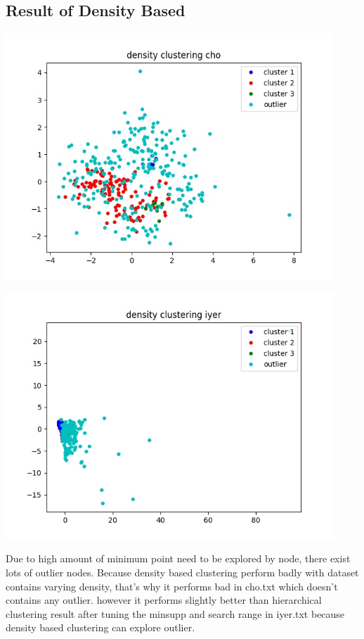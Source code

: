\documentclass[fleqn]{llncs}
\begin{document}
\subsection{Result of Density Based}

\includegraphics[width=350pt]{densitycho.jpg}

\includegraphics[width=350pt]{densityiyer.jpg}

Due to high amount of minimum point need to be explored by node, there exist lots of outlier nodes. Because density based clustering perform badly with dataset contains varying density, that's why it performs bad in cho.txt which doesn't contains any outlier. however it performs slightly better than hierarchical clustering result after tuning the minsupp and search range in iyer.txt because density based clustering can explore outlier.
\end{document}
